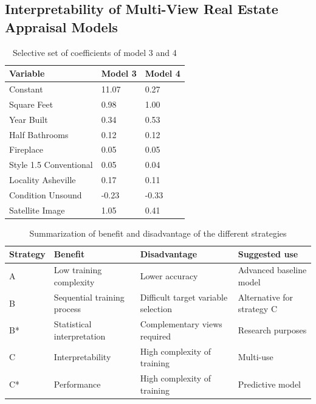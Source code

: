 \documentclass[letterpaper]{article} %
\begin{document}
\subsection{Interpretability of Multi-View Real Estate Appraisal Models}

\begin{table}[b]
\centering
\begin{tabular}{|l|l|l|}
\hline
\textbf{Variable} & \textbf{Model 3} & \textbf{Model 4} \\ \hline
Constant & 11.07 & 0.27 \\
Square Feet  & 0.98  & 1.00 \\
Year Built  & 0.34 & 0.53 \\
Half Bathrooms   & 0.12 & 0.12 \\
Fireplace & 0.05 & 0.05 \\
Style 1.5 Conventional & 0.05 & 0.04 \\
Locality Asheville & 0.17 & 0.11 \\
Condition Unsound & -0.23 & -0.33 \\
\hline
Satellite Image  & 1.05 &  0.41 \\
\hline
\end{tabular}
\caption{Selective set of coefficients of model 3 and 4}
\label{tab:coefficients}
\end{table}

\begin{table}[t]
\centering
\begin{tabular}{|l|l|l|l|}
\hline
\textbf{Strategy} & \textbf{Benefit} & \textbf{Disadvantage} & \textbf{Suggested use} \\ \hline
A & Low training complexity & Lower accuracy & Advanced baseline model \\ \hline
B & Sequential training process & Difficult target variable selection & Alternative for strategy C \\ \hline
B* & Statistical interpretation & Complementary views required & Research purposes \\ \hline
C & Interpretability & High complexity of training & Multi-use \\  \hline
C* & Performance & High complexity of training & Predictive model \\
\hline
\end{tabular}
\caption{Summarization of benefit and disadvantage of the different strategies}
\label{tab:strength}
\end{table}
\end{document}
